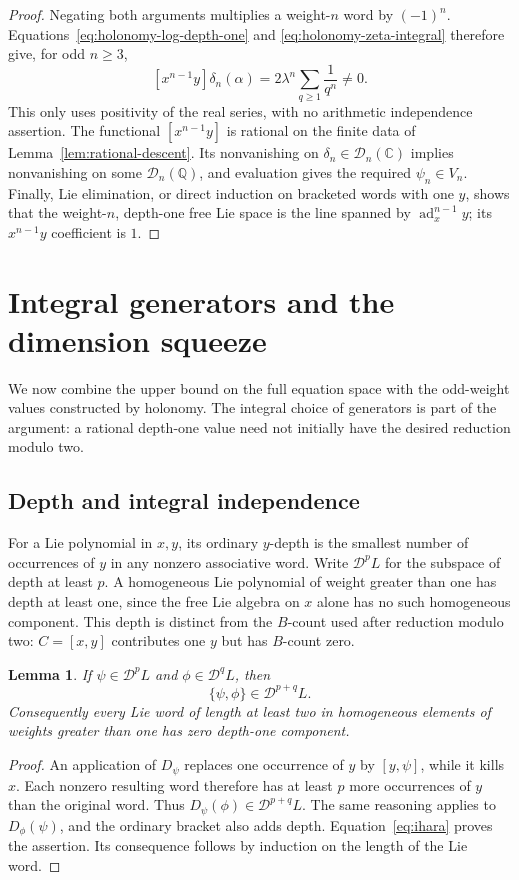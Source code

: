 \documentclass[11pt]{article}
\newtheorem{lemma}[theorem]{Lemma}
\theoremstyle{definition}
\theoremstyle{remark}
\numberwithin{equation}{section}
\begin{document}
\begin{proof}
Negating both arguments multiplies a weight-$n$ word by $(-1)^n$.
Equations~\eqref{eq:holonomy-log-depth-one} and
\eqref{eq:holonomy-zeta-integral} therefore give, for odd $n\geq3$,
\begin{equation}\label{eq:holonomy-nonzero-odd}
 [x^{n-1}y]\delta_n(\alpha)
 =2\lambda^n\sum_{q\geq1}\frac1{q^n}\ne0.
\end{equation}
This only uses positivity of the real series, with no arithmetic
independence assertion.  The functional $[x^{n-1}y]$ is rational on
the finite data of Lemma~\ref{lem:rational-descent}.  Its nonvanishing
on $\delta_n\in\mathcal D_n(\mathbb C)$ implies nonvanishing on some
$\mathcal D_n(\mathbb Q)$, and evaluation gives the required $\psi_n\in V_n$.
Finally, Lie elimination, or direct induction on bracketed words with
one $y$, shows that the weight-$n$, depth-one free Lie space is the
line spanned by $\operatorname{ad}_x^{n-1}y$; its $x^{n-1}y$ coefficient is $1$.
\end{proof}

\section{Integral generators and the dimension squeeze}
\label{sec:induction}

We now combine the upper bound on the full equation space with the
odd-weight values constructed by holonomy.  The integral choice of
generators is part of the argument: a rational depth-one value need
not initially have the desired reduction modulo two.

\subsection{Depth and integral independence}
For a Lie polynomial in \(x,y\), its ordinary \(y\)-depth is the
smallest number of occurrences of \(y\) in any nonzero associative
word.  Write \(\mathcal D^p L\) for the subspace of depth at least
\(p\).  A homogeneous Lie polynomial of weight greater than one
has depth at least one, since the free Lie algebra on \(x\) alone
has no such homogeneous component.
This depth is distinct from the \(B\)-count used after reduction
modulo two: \(C=[x,y]\) contributes one \(y\) but has \(B\)-count zero.

\begin{lemma}\label{lem:depth-addition}
If \(\psi\in\mathcal D^p L\) and
\(\phi\in\mathcal D^q L\), then
\[
 \{\psi,\phi\}\in\mathcal D^{p+q}L.
\]
Consequently every Lie word of length at least two in homogeneous
elements of weights greater than one has zero depth-one component.
\end{lemma}
\begin{proof}
An application of \(D_\psi\) replaces one occurrence of \(y\) by
\([y,\psi]\), while it kills \(x\).  Each nonzero resulting word
therefore has at least \(p\) more occurrences of \(y\) than the
original word.  Thus
\(D_\psi(\phi)\in\mathcal D^{p+q}L\).
The same reasoning applies to \(D_\phi(\psi)\), and the ordinary
bracket also adds depth.  Equation~\eqref{eq:ihara} proves the
assertion.  Its consequence follows by induction on the length of
the Lie word.
\end{proof}
\end{document}
